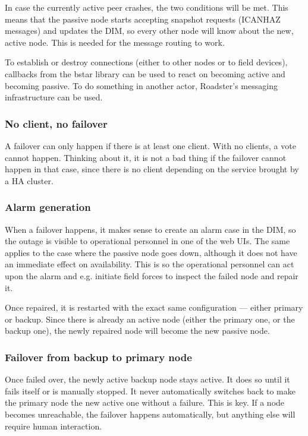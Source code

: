In case the currently active peer crashes, the two conditions will be met.
This means that the passive node starts accepting snapshot requests (ICANHAZ
messages) and updates the DIM, so every other node will know about the new,
active node. This is needed for the message routing to work.

To establish or destroy connections (either to other nodes or to field
devices), callbacks from the \gls{bstar} library can be used to react on
becoming active and becoming passive. To do something in another actor,
Roadster's messaging infrastructure can be used.





\subsubsection{No client, no failover}
A failover can only happen if there is at least one client. With no clients, a
vote cannot happen. Thinking about it, it is not a bad thing if the failover
cannot happen in that case, since there is no client depending on the service
brought by a HA cluster.

\subsubsection{Alarm generation}
When a failover happens, it makes sense to create an alarm case in the
DIM, so the outage is visible to operational personnel in one of the web UIs.
The same applies to the case where the passive node goes down, although it
does not have an immediate effect on availability.  This is so the operational
personnel can act upon the alarm and e.g. initiate field forces to inspect the
failed node and repair it.

Once repaired, it is restarted with the exact same configuration --- either primary
or backup. Since there is already an active node (either the primary one,
or the backup one), the newly repaired node will become the new passive node.

\subsubsection{Failover from backup to primary node}
Once failed over, the newly active backup node stays active. It does so until it
fails itself or is manually stopped. It never automatically switches back to
make the primary node the new active one without a failure. This is key. If a
node becomes unreachable, the failover happens automatically, but anything else will
require human interaction.

